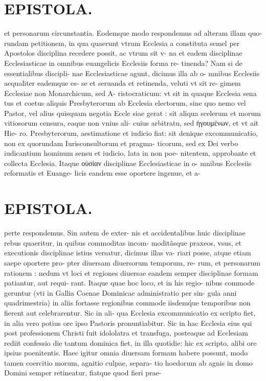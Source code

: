 \documentclass{article}
\begin{document}
\begin{pages}
\section*{EPISTOLA. }et personarum circunstantia. Eodemque modo respondemus ad alteram illam quo- rundam petitionem, in qua quaerunt vtrum Ecclesia a constituta semel per Apostolos disciplina recedere possit, ac vtrum sit v- na et eadem disciplinae Ecclesiasticae in omnibus euangelicis Ecclesiis forma re- tinenda? Nam si de essentialibus discipli- nae Ecclesiasticae agunt, dicimus illa ab o- mnibus Ecclesiis aequaliter eademque es- se et seruanda et retinenda, veluti vt sit re- gimem Ecclesiae non Monarchicum, sed A- ristocraticum: vt sit in quaque Ecclesia sena tus et coetus aliquis Presbyterorum ab Ecclesia electorum, sine quo nemo vel Pastor, vel alius quisquam negotia Eccle siae gerat : sit aliqua scelerum et morum vitiosorum censura, eaque non vnius ali- cuius arbitratu, sed ἡγουμένων, et vt ait Hie- ro. Presbyterorum, aestimatione et iudicio fiat: sit denique excommunicatio, non ex quorundam Iurisconsultorum et pragma- ticorum, sed ex Dei verbo iudicantium hominum sensu et iudicio, lata in non poe- nitentem, approbante et collecta Ecclesia. Itaque οὐσίαν disciplinae Ecclesiasticae in o- mnibus Ecclesiis reformatis et Euange- licis eandem esse oportere ingenue, et a- 
\section*{EPISTOLA. }perte respondemus. Sin autem de exter- nis et accidentalibus huic disciplinae rebus quaeritur, in quibus commoditas incom- moditâsque praxeos, vsus, et executionis disciplinae istius versatur, dicimus illas va- riari posse, atque etiam saepe oportere pro- pter diuersam diuersorum temporum, re- rum, et personarum rationem : nedum vt loci et regiones diuersae eandem semper disciplinae formam patiantur, aut requi- rant. Itaque quae hoc loco, et in his regio- nibus commode geruntur (vti in Gallia Coenae Dominicae administratio per sin- gula anni quadrimestria) in aliis fortasse regionibus commode iisdemq́ue temporibus non fierent aut celebrarentur. Sic in ali- qua Ecclesia excommunicatio ex scripto fiet, in alia vero potius ore ipso Pastoris pronuntiabitur. Sic in hac Ecclesia eius qui post professionem Christi fuit idololatra et transfuga, posteaque ad Ecclesiam rediit confessio die tantum dominica fiet, in illa quotidie: hic ex scripto, alibi ore ipsius poenitentis. Haec igitur omnia diuersam formam habere possunt, modo tamen coercitio morum, agnitio culpae, separa- tio hoedorum ab agnis in domo Domini semper retineatur, fiatque quod fieri prae- 

\end{pages}
\end{document}
